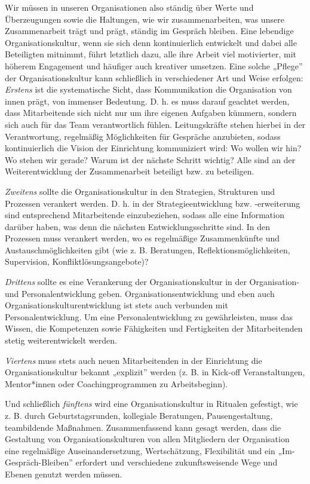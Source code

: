 \documentclass[
  letterpaper,
]{book}
\begin{document}
Wir müssen in unseren Organisationen also ständig über Werte und
Überzeugungen sowie die Haltungen, wie wir zusammenarbeiten, was unsere
Zusammenarbeit trägt und prägt, ständig im Gespräch bleiben. Eine
lebendige Organisationskultur, wenn sie sich denn kontinuierlich
entwickelt und dabei alle Beteiligten mitnimmt, führt letztlich dazu,
alle ihre Arbeit viel motivierter, mit höherem Engagement und häufiger
auch kreativer umsetzen. Eine solche „Pflege'' der Organisationskultur
kann schließlich in verschiedener Art und Weise erfolgen: \emph{Erstens}
ist die systematische Sicht, dass Kommunikation die Organisation von
innen prägt, von immenser Bedeutung. D. h. es muss darauf geachtet
werden, dass Mitarbeitende sich nicht nur um ihre eigenen Aufgaben
kümmern, sondern sich auch für das Team verantwortlich fühlen.
Leitungskräfte stehen hierbei in der Verantwortung, regelmäßig
Möglichkeiten für Gespräche anzubieten, sodass kontinuierlich die Vision
der Einrichtung kommuniziert wird: Wo wollen wir hin? Wo stehen wir
gerade? Warum ist der nächste Schritt wichtig? Alle sind an der
Weiterentwicklung der Zusammenarbeit beteiligt bzw. zu beteiligen.

\emph{Zweitens} sollte die Organisationskultur in den Strategien,
Strukturen und Prozessen verankert werden. D. h. in der
Strategieentwicklung bzw. -erweiterung sind entsprechend Mitarbeitende
einzubeziehen, sodass alle eine Information darüber haben, was denn die
nächsten Entwicklungsschritte sind. In den Prozessen muss verankert
werden, wo es regelmäßige Zusammenkünfte und Austauschmöglichkeiten gibt
(wie z. B. Beratungen, Reflektionsmöglichkeiten, Supervision,
Konfliktlösungsangebote)?

\emph{Drittens} sollte es eine Verankerung der Organisationskultur in
der Organisation- und Personalentwicklung geben.
Organisationsentwicklung und eben auch Organisationskulturentwicklung
ist stets auch verbunden mit Personalentwicklung. Um eine
Personalentwicklung zu gewährleisten, muss das Wissen, die Kompetenzen
sowie Fähigkeiten und Fertigkeiten der Mitarbeitenden stetig
weiterentwickelt werden.

\emph{Viertens} muss stets auch neuen Mitarbeitenden in der Einrichtung
die Organisationskultur bekannt „explizit'' werden (z. B. in Kick-off
Veranstaltungen, Mentor*innen oder Coachingprogrammen zu Arbeitsbeginn).

Und schließlich \emph{fünftens} wird eine Organisationskultur in
Ritualen gefestigt, wie z. B. durch Geburtstagsrunden, kollegiale
Beratungen, Pausengestaltung, teambildende Maßnahmen. Zusammenfassend
kann gesagt werden, dass die Gestaltung von Organisationskulturen von
allen Mitgliedern der Organisation eine regelmäßige Auseinandersetzung,
Wertschätzung, Flexibilität und ein „Im-Gespräch-Bleiben'' erfordert und
verschiedene zukunftsweisende Wege und Ebenen genutzt werden müssen.
\end{document}
